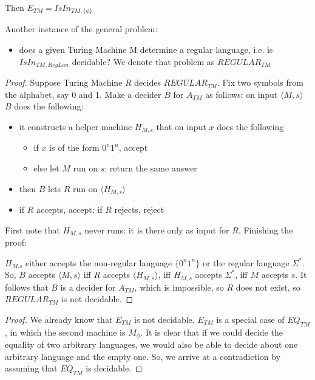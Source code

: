Then $E_{TM} = IsIn_{TM,\{\phi\}}$


Another instance of the general problem:
\begin{itemize}
\item[] does a given Turing Machine M determine a regular language,
  i.e.  is $IsIn_{TM,RegLan}$ decidable? We denote that problem as 
$REGULAR_{TM}$
\end{itemize}

\begin{proof}
Suppose Turing Machine $R$ decides $REGULAR_{TM}$. Fix two symbols
from the alphabet, say 0 and 1. Make a decider $B$ for $A_{TM}$ as
follows: on input $\langle M,s \rangle$ $B$ does the following:
\begin{itemize}
\item it constructs a helper machine $H_{M,s}$ that on input $x$ does
  the following
\begin{itemize}
\item if $x$ is of the form $0^n1^n$, accept
\item else let $M$ run on $s$; return the same answer
\end{itemize}

\item then $B$ lets $R$ run on  $\langle H_{M,s} \rangle$
\item if $R$ accepts, accept; if $R$ rejects, reject
\end{itemize}

First note that $H_{M,s}$ never runs: it is there only as input for
$R$. Finishing the proof:


$H_{M.s}$ either accepts the non-regular language $\{0^n1^n\}$
or  the regular language $\Sigma^*$. So, $B$ accepts $\langle
M,s \rangle$ iff $R$ accepts $\langle H_{M,s} \rangle$, iff $H_{M,s}$
accepts $\Sigma^*$, iff $M$ accepts $s$. It follows that $B$ is a
decider for $A_{TM}$, which is impossible, so $R$ does not exist, so
$REGULAR_{TM}$ is not decidable.
\end{proof}


\begin{proof}
We already know that $E_{TM}$ is not decidable. $E_{TM}$ is a special
case of $EQ_{TM}$, in which the second machine is $M_\phi$. It is
clear that if we could decide the equality of two arbitrary languages, 
we would also be able to decide about one arbitrary language
and the empty one. So, we arrive at a contradiction by assuming that
$EQ_{TM}$ is decidable.
\end{proof}

